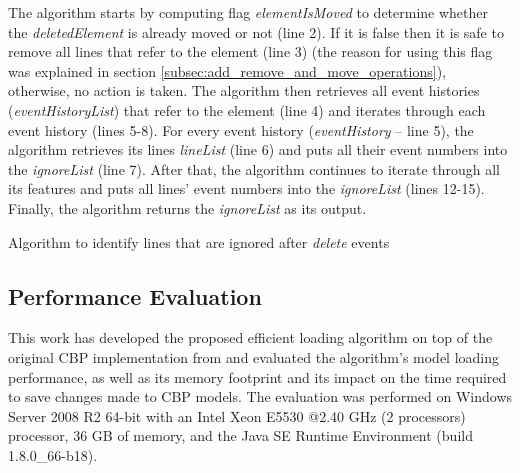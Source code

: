 \documentclass[12pt, a4paper]{report} \usepackage[titletoc]{appendix}
\begin{document}
The algorithm starts by computing flag \emph{elementIsMoved} to determine whether the \emph{deletedElement} is already moved or not (line 2).
If it is false then it is safe to remove all lines that refer to the element (line 3) (the reason for using this flag was explained in section \ref{subsec:add_remove_and_move_operations}), otherwise, no action is taken. The algorithm then retrieves all event histories (\emph{eventHistoryList}) that refer to the element (line 4) and iterates through each event history (lines 5-8). For every event history (\emph{eventHistory} -- line 5), the algorithm retrieves its lines \emph{lineList} (line 6) and puts all their event numbers into the \emph{ignoreList} (line 7). After that, the algorithm continues to iterate through all its features and puts all lines' event numbers into the \emph{ignoreList} (lines 12-15). Finally, the algorithm returns the \emph{ignoreList} as its output.

\begin{algorithm}[H]
	\begin{small}
	\end{small}
	\caption{Algorithm to identify lines that are ignored after \emph{delete} events}
	\label{alg:create_delete_optimisation}
\end{algorithm}

\subsection{Performance Evaluation}
\label{sec:performance_evaluation}
This work has developed the proposed efficient loading algorithm on top of the original CBP implementation from \cite{yohannis2017turning} and evaluated the algorithm's model loading performance, as well as its memory footprint and its impact on the time required to save changes made to CBP models. The evaluation was performed on Windows Server 2008 R2 64-bit with an Intel Xeon E5530 @2.40 GHz (2 processors) processor, 36 GB of memory, and the Java SE Runtime Environment (build 1.8.0\_66-b18).
\end{document}
